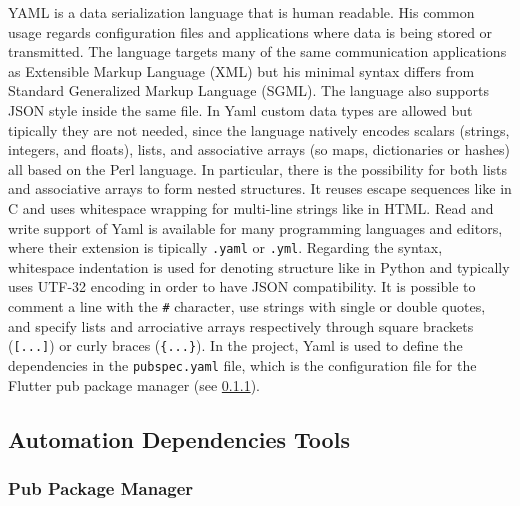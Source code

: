 YAML is a data serialization language that is human readable. His common usage regards configuration files and applications where data is being stored or transmitted. The language targets many of the same communication applications as Extensible Markup Language (XML) but his minimal syntax differs from Standard Generalized Markup Language (SGML). The language also supports JSON style inside the same file. In Yaml custom data types are allowed but tipically they are not needed, since the language natively encodes scalars (strings, integers, and floats), lists, and associative arrays (so maps, dictionaries or hashes) all based on the Perl language. In particular, there is the possibility for both lists and associative arrays to form nested structures. It reuses escape sequences like in C and uses whitespace wrapping for multi-line strings like in HTML. Read and write support of Yaml is available for many programming languages and editors, where their extension is tipically \texttt{.yaml} or \texttt{.yml}. Regarding the syntax, whitespace indentation is used for denoting structure like in Python and typically uses UTF-32 encoding in order to have JSON compatibility. It is possible to comment a line with the \texttt{\#} character, use strings with single or double quotes, and specify lists and arrociative arrays respectively through square brackets (\texttt{[...]}) or curly braces (\texttt{\{...\}})\cite{Yaml}. In the project, Yaml is used to define the dependencies in the \texttt{pubspec.yaml} file, which is the configuration file for the Flutter pub package manager (see \cref{subsubsec:pub}).

\newpage
\subsection{Automation Dependencies Tools}

\subsubsection{Pub Package Manager}
\label{subsubsec:pub}

